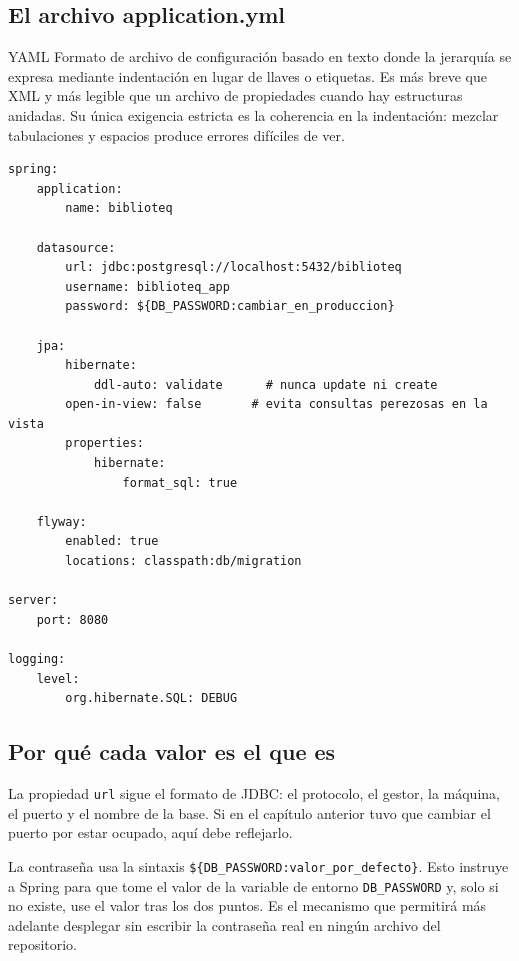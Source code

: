 \documentclass[11pt,a4paper,openany]{book}
\begin{document}
\subsection{El archivo application.yml}
\label{sec:appyml}

\begin{cajadefinicion}{YAML}
	Formato de archivo de configuración basado en texto donde la jerarquía se expresa mediante indentación en lugar de llaves o etiquetas. Es más breve que XML y más legible que un archivo de propiedades cuando hay estructuras anidadas. Su única exigencia estricta es la coherencia en la indentación: mezclar tabulaciones y espacios produce errores difíciles de ver.
\end{cajadefinicion}

\begin{lstlisting}[style=yaml,caption={Configuracion inicial de la aplicacion en application.yml.},label={lst:appyml}]
spring:
	application:
		name: biblioteq

	datasource:
		url: jdbc:postgresql://localhost:5432/biblioteq
		username: biblioteq_app
		password: ${DB_PASSWORD:cambiar_en_produccion}

	jpa:
		hibernate:
			ddl-auto: validate      # nunca update ni create
		open-in-view: false       # evita consultas perezosas en la vista
		properties:
			hibernate:
				format_sql: true

	flyway:
		enabled: true
		locations: classpath:db/migration

server:
	port: 8080

logging:
	level:
		org.hibernate.SQL: DEBUG
\end{lstlisting}

\subsection{Por qué cada valor es el que es}
\label{sec:appyml-porque}

La propiedad \texttt{url} sigue el formato de JDBC: el protocolo, el gestor, la máquina, el puerto y el nombre de la base. Si en el capítulo anterior tuvo que cambiar el puerto por estar ocupado, aquí debe reflejarlo.

La contraseña usa la sintaxis \texttt{\$\{DB\_PASSWORD:valor\_por\_defecto\}}. Esto instruye a Spring para que tome el valor de la variable de entorno \texttt{DB\_PASSWORD} y, solo si no existe, use el valor tras los dos puntos. Es el mecanismo que permitirá más adelante desplegar sin escribir la contraseña real en ningún archivo del repositorio.
\end{document}
